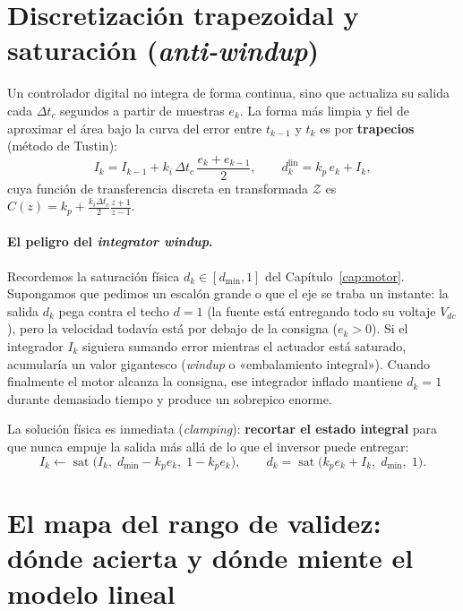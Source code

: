 \documentclass[11pt,a4paper,oneside]{book}
\newcommand{\sat}{\operatorname{sat}}
\begin{document}
\section{Discretización trapezoidal y saturación (\emph{anti-windup})}

Un controlador digital no integra de forma continua, sino que actualiza su
salida cada $\Delta t_c$ segundos a partir de muestras $e_k$. La forma más limpia
y fiel de aproximar el área bajo la curva del error entre $t_{k-1}$ y $t_k$ es
por \textbf{trapecios} (método de Tustin):
\begin{equation}
  I_k = I_{k-1} + k_i\,\Delta t_c\,\frac{e_k + e_{k-1}}{2},
  \qquad
  d_k^{\text{lin}} = k_p\,e_k + I_k,
  \label{eq:tustin_cap8}
\end{equation}
cuya función de transferencia discreta en transformada $\mathcal{Z}$ es
$C(z) = k_p + \frac{k_i\Delta t_c}{2}\frac{z+1}{z-1}$.

\paragraph{El peligro del \emph{integrator windup}.}
Recordemos la saturación física $d_k \in [d_{\min}, 1]$ del
Capítulo~\ref{cap:motor}. Supongamos que pedimos un escalón grande o que el eje
se traba un instante: la salida $d_k$ pega contra el techo $d = 1$ (la fuente
está entregando todo su voltaje $V_{dc}$), pero la velocidad todavía está por
debajo de la consigna ($e_k > 0$). Si el integrador $I_k$ siguiera sumando error
mientras el actuador está saturado, acumularía un valor gigantesco
(\emph{windup} o «embalamiento integral»). Cuando finalmente el motor alcanza la
consigna, ese integrador inflado mantiene $d_k = 1$ durante demasiado tiempo y
produce un sobrepico enorme.

La solución física es inmediata (\emph{clamping}): \textbf{recortar el estado
integral} para que nunca empuje la salida más allá de lo que el inversor puede
entregar:
\begin{equation}
  I_k \leftarrow \sat\!\big(I_k,\; d_{\min} - k_p e_k,\; 1 - k_p e_k\big),
  \qquad
  d_k = \sat\!\big(k_p e_k + I_k,\; d_{\min},\; 1\big).
  \label{eq:antiwindup_cap8}
\end{equation}

\section{El mapa del rango de validez: dónde acierta y dónde miente el modelo lineal}
\end{document}
